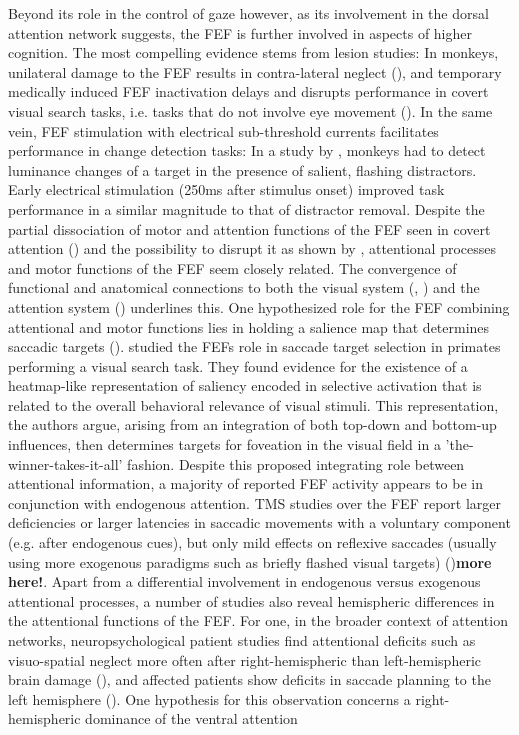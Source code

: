 \documentclass[a4paper, 12pt]{scrreprt}
\begin{document}
Beyond its role in the control of gaze however, as its involvement in the dorsal attention network suggests, the FEF is further involved in aspects of higher cognition. The most compelling evidence stems from lesion studies: In monkeys, unilateral damage to the FEF results in contra-lateral neglect (\cite{crowne1981effects}), and temporary medically induced FEF inactivation delays and disrupts performance in covert visual search tasks, i.e. tasks that do not involve eye movement (\cite{monosov2009frontal}). In the same vein, FEF stimulation with electrical sub-threshold currents facilitates performance in change detection tasks: In a study by \textcite{moore2004microstimulation}, monkeys had to detect luminance changes of a target in the presence of salient, flashing distractors. Early electrical stimulation (250ms after stimulus onset) improved task performance in a similar magnitude to that of distractor removal. \newline Despite the partial dissociation of motor and attention functions of the FEF seen in covert attention (\cite{vossel2014dorsal}) and the possibility to disrupt it as shown by \textcite{monosov2009frontal}, attentional processes and motor functions of the FEF seem closely related. The convergence of functional and anatomical connections to both the visual system (\cite{stanton1995topography}, \cite{schall1995topography}) and the attention system (\cite{corbetta2002control}) underlines this. One hypothesized role for the FEF combining attentional and motor functions lies in holding a salience map that determines saccadic targets (\cite{itti2001computational}). \textcite{thompson2005visual} studied the FEFs role in saccade target selection in primates performing a visual search task. They found evidence for the existence of a heatmap-like representation of saliency encoded in selective activation that is related to the overall behavioral relevance of visual stimuli. This representation, the authors argue, arising from an integration of both top-down and bottom-up influences, then determines targets for foveation in the visual field in a 'the-winner-takes-it-all' fashion. Despite this proposed integrating role between attentional information, a majority of reported FEF activity appears to be in conjunction with endogenous attention. TMS studies over the FEF report larger deficiencies or larger latencies in saccadic movements with a voluntary component (e.g. after endogenous cues), but only mild effects on reflexive saccades (usually using more exogenous paradigms such as briefly flashed visual targets) (\cite{vernet2014corrigendum})\textbf{more here!}. Apart from a differential involvement in endogenous versus exogenous attentional processes, a number of studies also reveal hemispheric differences in the attentional functions of the FEF. For one, in the broader context of attention networks, neuropsychological patient studies find attentional deficits such as visuo-spatial neglect more often after right-hemispheric than left-hemispheric brain damage (\cite{vernet2014corrigendum}), and affected patients show deficits in saccade planning to the left hemisphere (\cite{Behrmann2001ImpairedIB}). One hypothesis for this observation concerns a right-hemispheric dominance of the ventral attention 
\end{document}
